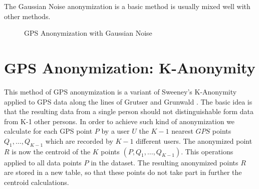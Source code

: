 The Gaussian Noise anonymization is a basic method is usually mixed
well with other methods.

\begin{figure}
  \centering
  \quad
  \caption{GPS Anonymization with Gaussian Noise}
  \label{fig:noise}
\end{figure}

\section{GPS Anonymization: K-Anonymity}
This method of GPS anonymization is a variant of Sweeney's K-Anonymity
\cite{sweeney2002k} applied to GPS data along the lines of Grutser and
Grunwald \cite{Gruteser2003}.  The basic idea is that the resulting
data from a single person should not distinguishable form data from
K-1 other persons. In order to achieve such kind of anonymization we
calculate for each GPS point $P$ by a user $U$ the $K-1$ nearest $GPS$
points $Q_1, \dots, Q_{K-1}$ which are recorded by $K-1$ different
users.  The anonymized point $R$ is now the centroid of the $K$ points
$(P,Q_1,\dots,Q_{K-1})$. This operations applied to all data points
$P$ in the dataset. The resulting anonymized points $R$ are stored in
a new table, so that these points do not take part in further the
centroid calculations.

